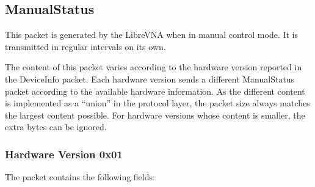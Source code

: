 \documentclass[a4paper,11pt]{article}
\begin{document}
\subsection{ManualStatus}
This packet is generated by the LibreVNA when in manual control mode. It is transmitted in regular intervals on its own.

The content of this packet varies according to the hardware version reported in the DeviceInfo packet. Each hardware version sends a different ManualStatus packet according to the available hardware information. As the different content is implemented as a ``union'' in the protocol layer, the packet size always matches the largest content possible. For hardware versions whose content is smaller, the extra bytes can be ignored.

\subsubsection{Hardware Version 0x01}
The packet contains the following fields:
\end{document}
